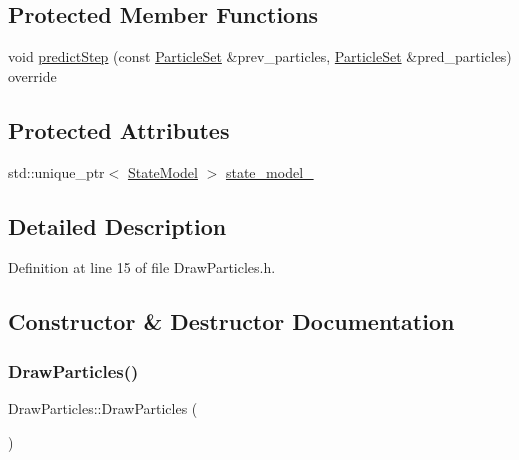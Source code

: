 \subsection*{Protected Member Functions}
\begin{DoxyCompactItemize}
\item 
void \mbox{\hyperlink{classbfl_1_1DrawParticles_a36deaed86f1146431cacefa23f0445d0}{predict\+Step}} (const \mbox{\hyperlink{classbfl_1_1ParticleSet}{Particle\+Set}} \&prev\+\_\+particles, \mbox{\hyperlink{classbfl_1_1ParticleSet}{Particle\+Set}} \&pred\+\_\+particles) override
\end{DoxyCompactItemize}
\subsection*{Protected Attributes}
\begin{DoxyCompactItemize}
\item 
std\+::unique\+\_\+ptr$<$ \mbox{\hyperlink{classbfl_1_1StateModel}{State\+Model}} $>$ \mbox{\hyperlink{classbfl_1_1DrawParticles_a4acbc6e750895a3a27e68d0a9656b8cf}{state\+\_\+model\+\_\+}}
\end{DoxyCompactItemize}


\subsection{Detailed Description}


Definition at line 15 of file Draw\+Particles.\+h.



\subsection{Constructor \& Destructor Documentation}
\mbox{\label{classbfl_1_1DrawParticles_acd7269927dc19bf3f34f7a65934c1e2c}} 
\subsubsection{\texorpdfstring{Draw\+Particles()}{DrawParticles()}\hspace{0.1cm}{\footnotesize\ttfamily [1/2]}}
{\footnotesize\ttfamily Draw\+Particles\+::\+Draw\+Particles (\begin{DoxyParamCaption}{ }\end{DoxyParamCaption})\hspace{0.3cm}{\ttfamily [noexcept]}}




